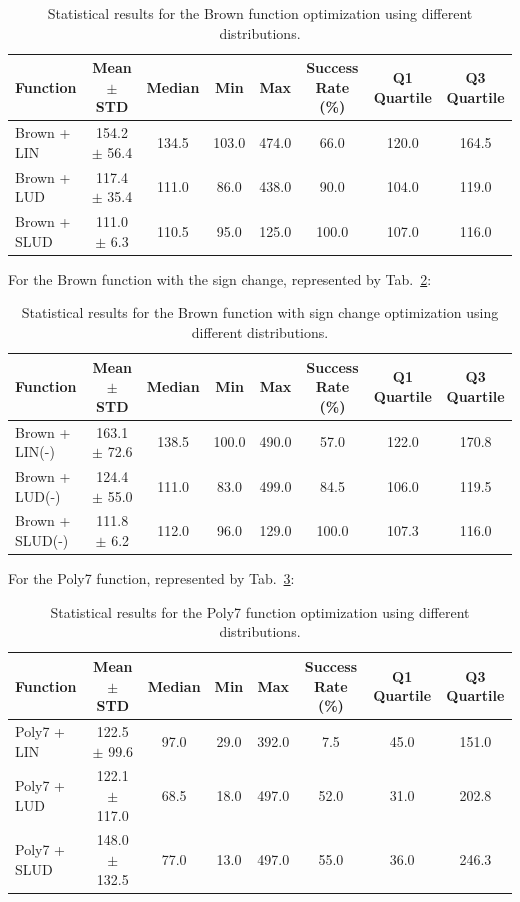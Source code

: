 \documentclass[10pt,fleqn,a4paper,twoside]{article}
\begin{document}
\begin{table}[H]
\centering
\caption{Statistical results for the Brown function optimization using different distributions.}
\label{Tab:3}
\begin{tabular}{l|c|c|c|c|c|c|c}
\hline
\textbf{Function} & \textbf{Mean $\pm$ STD} & \textbf{Median} & \textbf{Min} & \textbf{Max} & \textbf{Success Rate (\%)} & \textbf{Q1 Quartile} & \textbf{Q3 Quartile}\\
\hline
Brown + LIN          & 154.2 $\pm$ 56.4      & 134.5 & 103.0 & 474.0 & 66.0 & 120.0 & 164.5\\
Brown + LUD          & 117.4 $\pm$ 35.4      & 111.0 & 86.0 & 438.0 & 90.0 & 104.0 & 119.0\\
Brown + SLUD         & 111.0 $\pm$ 6.3       & 110.5 & 95.0 & 125.0 & 100.0 & 107.0 & 116.0\\
\hline
\end{tabular}
\end{table}

For the Brown function with the sign change, represented by Tab.~\ref{Tab:3b}:

\begin{table}[H]
\centering
\caption{Statistical results for the Brown function with sign change optimization using different distributions.}
\label{Tab:3b}
\begin{tabular}{l|c|c|c|c|c|c|c}
\hline
\textbf{Function} & \textbf{Mean $\pm$ STD} & \textbf{Median} & \textbf{Min} & \textbf{Max} & \textbf{Success Rate (\%)} & \textbf{Q1 Quartile} & \textbf{Q3 Quartile}\\
\hline
Brown + LIN(-)          & 163.1 $\pm$ 72.6      & 138.5 & 100.0 & 490.0 & 57.0 & 122.0 & 170.8\\
Brown + LUD(-)          & 124.4 $\pm$ 55.0      & 111.0 & 83.0 & 499.0 & 84.5 & 106.0 & 119.5\\
Brown + SLUD(-)         & 111.8 $\pm$ 6.2       & 112.0 & 96.0 & 129.0 & 100.0 & 107.3 & 116.0\\
\hline
\end{tabular}
\end{table}


For the Poly7 function, represented by Tab.~\ref{Tab:4}:

\begin{table}[H]
\centering
\caption{Statistical results for the Poly7 function optimization using different distributions.}
\label{Tab:4}
\begin{tabular}{l|c|c|c|c|c|c|c}
\hline
\textbf{Function} & \textbf{Mean $\pm$ STD} & \textbf{Median} & \textbf{Min} & \textbf{Max} & \textbf{Success Rate (\%)} & \textbf{Q1 Quartile} & \textbf{Q3 Quartile}\\
\hline
Poly7 + LIN          & 122.5 $\pm$ 99.6      & 97.0 & 29.0 & 392.0 & 7.5 & 45.0 & 151.0\\
Poly7 + LUD          & 122.1 $\pm$ 117.0     & 68.5 & 18.0 & 497.0 & 52.0 & 31.0 & 202.8\\
Poly7 + SLUD         & 148.0 $\pm$ 132.5     & 77.0 & 13.0 & 497.0 & 55.0 & 36.0 & 246.3\\
\hline
\end{tabular}
\end{table}
\end{document}
